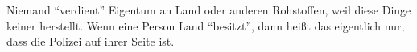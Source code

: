 Niemand ``verdient'' Eigentum an Land oder anderen Rohstoffen, weil diese Dinge keiner herstellt.
Wenn eine Person Land ``besitzt'', dann heißt das eigentlich nur, dass die Polizei auf ihrer Seite ist.